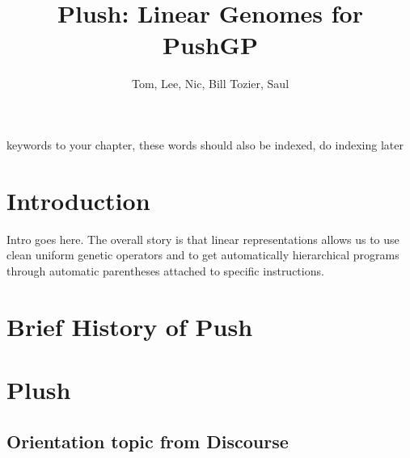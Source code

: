 %

\title*{Plush: Linear Genomes for PushGP}
\author{Tom, Lee, Nic, Bill Tozier, Saul}

\maketitle


\begin{keywords}
keywords to your chapter, these words should also be indexed, do indexing later
\end{keywords}

\section{Introduction}
\label{Introduction}

Intro goes here. The overall story is that linear representations allows us to use clean uniform genetic operators and to get automatically hierarchical programs through automatic parentheses attached to specific instructions.



\section{Brief History of Push}



\section{Plush}




\subsection{Orientation topic from Discourse}

